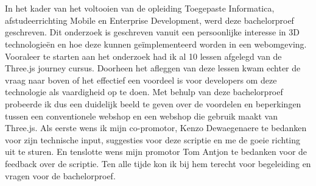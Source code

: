 
\chapter*{}%
\label{ch:voorwoord}


In het kader van het voltooien van de opleiding Toegepaste Informatica, afstudeerrichting Mobile en Enterprise Development, werd deze bachelorproef geschreven. Dit onderzoek is geschreven vanuit een persoonlijke interesse in 3D technologieën en hoe deze kunnen geïmplementeerd worden in een webomgeving. Vooraleer te starten aan het onderzoek had ik al 10 lessen afgelegd van de Three.js journey cursus. Doorheen het afleggen van deze lessen kwam echter de vraag naar boven of het effectief een voordeel is voor developers om deze technologie als vaardigheid op te doen. Met behulp van deze bachelorproef probeerde ik dus een duidelijk beeld te geven over de voordelen en beperkingen tussen een conventionele webshop en een webshop die gebruik maakt van Three.js.
\newline
\newline
Als eerste wens ik mijn co-promotor, Kenzo Dewaegenaere te bedanken voor zijn technische input, suggesties voor deze scriptie en me de goeie richting uit te sturen.
\newline
\newline
En tenslotte wens mijn promotor Tom Antjon te bedanken voor de feedback over de scriptie. Ten alle tijde kon ik bij hem terecht voor begeleiding en vragen voor de bachelorproef.

